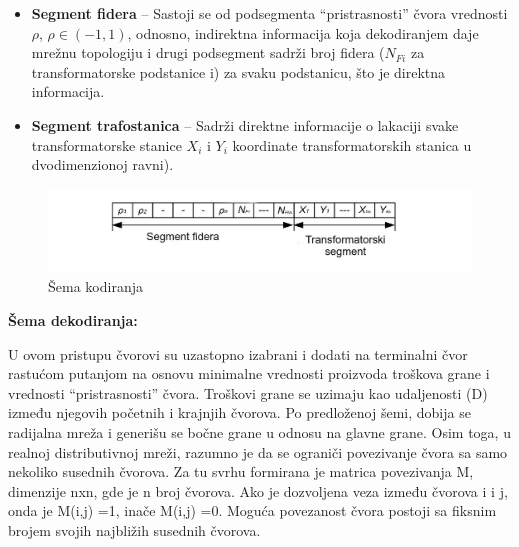 \documentclass[a4paper]{article}
\begin{document}
\vspace{5mm} 

\begin{itemize}
\item \textbf{Segment fidera} – Sastoji se od podsegmenta “pristrasnosti” čvora vrednosti $\rho$,  $\rho \in (-1,1)$, odnosno, indirektna informacija koja dekodiranjem daje mrežnu topologiju i drugi podsegment sadrži broj fidera (\(N_{Fi}\) za transformatorske podstanice i) za svaku podstanicu, što je direktna informacija.

\item \textbf{Segment trafostanica} – Sadrži direktne informacije o lakaciji svake transformatorske stanice \(X_{i}\) i \(Y_{i}\) koordinate transformatorskih stanica u dvodimenzionoj ravni).
\end{itemize}

\begin{figure}[htp]
    \centering
    \includegraphics[scale=0.3]{foto4.jpg}
    \caption{Šema kodiranja}
    \label{fig:sema_kodiranja}
\end{figure}

\textbf{Šema dekodiranja:} 

\vspace{5mm} 

U ovom pristupu čvorovi su uzastopno izabrani i dodati na terminalni čvor rastućom putanjom na osnovu minimalne vrednosti proizvoda troškova grane i vrednosti “pristrasnosti” čvora. Troškovi grane se uzimaju kao udaljenosti (D) između njegovih početnih i krajnjih čvorova. Po predloženoj šemi, dobija se radijalna mreža i generišu se bočne grane u odnosu na glavne grane. Osim toga, u realnoj distributivnoj mreži, razumno je da se ograniči povezivanje čvora sa samo nekoliko susednih čvorova. Za tu svrhu formirana je matrica povezivanja M, dimenzije nxn, gde je n broj čvorova. Ako je dozvoljena veza između čvorova i i j, onda je M(i,j) =1, inače  M(i,j) =0. Moguća povezanost čvora postoji sa fiksnim brojem svojih najbližih susednih čvorova.

\vspace{5mm}
\end{document}

